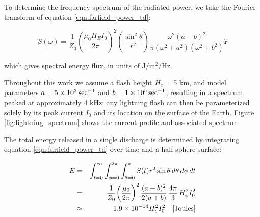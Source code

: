 To determine the frequency spectrum of the radiated power, we take the Fourier transform of equation \ref{eqn:farfield_power_td}:

\begin{equation}
\label{eqn:farfield_power_fd}
S(\omega) = \frac{1}{Z_0}\left(\frac{\mu_0 H_E I_0}{2 \pi}\right)^2\left(\frac{\sin^2\theta}{r^2}\right) \frac{\omega^2(a-b)^2}{\pi(\omega^2 + a^2)(\omega^2 + b^2)}  \mathbf{\hat{r}}
\end{equation}

which gives spectral energy flux, in units of J/m$^2$/Hz.

Throughout this work we assume a flash height $H_e$ = 5 km, and model parameters $a=5\times 10^{3}\,\mathrm{sec}^{-1}$ and $b=1\times 10^{5}\,\mathrm{sec}^{-1}$, resulting in a spectrum peaked at approximately 4 kHz; any lightning flash can then be parameterized solely by its peak current $I_0$ and its location on the surface of the Earth. Figure \ref{fig:lightning_spectrum} shows the current profile and associated spectrum.

The total energy released in a single discharge is determined by integrating equation \ref{eqn:farfield_power_td} over time and a half-sphere surface:

\begin{eqnarray}
\label{eqn:total_energy_below_iono}
E &= &\int_{t=0}^\infty \int_{\phi=0}^{2\pi} \int_{\theta=0}^\pi  S(t) r^2 \sin\theta\,d\theta\,d\phi\,dt \\
 & = & \frac{1}{Z_0}\bigg(\frac{\mu_0}{2\pi}\bigg)^2 \, \frac{(a - b)^2}{2 (a + b)}  \, \frac{4 \pi}{3} \, H_e^2 I_0^2 \\
 & \approx & 1.9\times 10^{-14}H_e^2 I_0^2 \quad[\mathrm{Joules}]
\end{eqnarray}


